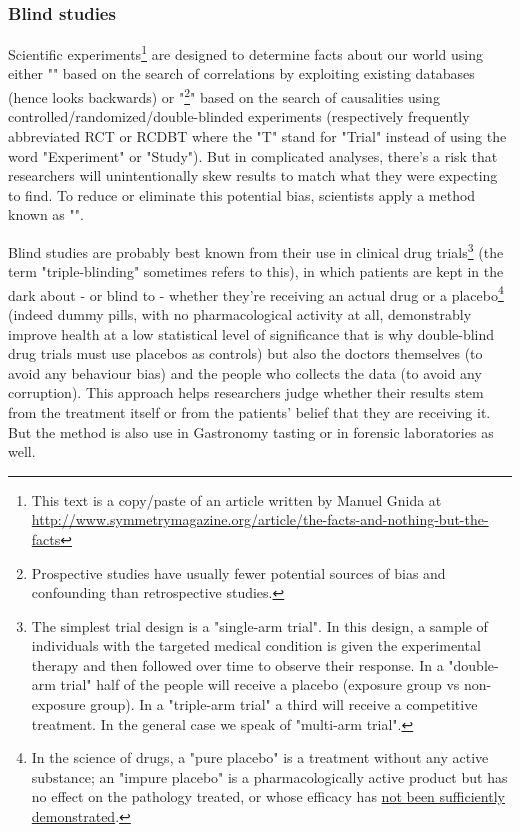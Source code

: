 	\subsubsection{Blind studies}
	Scientific experiments\footnote{This text is a copy/paste of an article written by Manuel Gnida at \url{http://www.symmetrymagazine.org/article/the-facts-and-nothing-but-the-facts}} are designed to determine facts about our world using either "" based on the search of correlations by exploiting existing databases (hence looks backwards) or "\footnote{Prospective studies have usually fewer potential sources of bias and confounding than retrospective studies.}" based on the search of causalities using controlled/randomized/double-blinded experiments (respectively frequently abbreviated RCT or RCDBT where the "T" stand for "Trial" instead of using the word "Experiment" or "Study"). But in complicated analyses, there's a risk that researchers will unintentionally skew results to match what they were expecting to find. To reduce or eliminate this potential bias, scientists apply a method known as "".
	
	Blind studies are probably best known from their use in clinical drug trials\footnote{The simplest trial design is a "single-arm trial". In this design, a sample of individuals with the targeted medical condition is given the experimental therapy and then followed over time to observe their response. In a "double-arm trial" half of the people will receive a placebo (exposure group vs non-exposure group). In a "triple-arm trial" a third will receive a competitive treatment. In the general case we speak of "multi-arm trial".} (the term "triple-blinding" sometimes refers to this), in which patients are kept in the dark about - or blind to - whether they're receiving an actual drug or a placebo\footnote{In the science of drugs, a "pure placebo" is a treatment without any active substance; an "impure placebo" is a pharmacologically active product but has no effect on the pathology treated, or whose efficacy has \underline{not been sufficiently demonstrated}.} (indeed dummy pills, with no pharmacological activity at all, demonstrably improve health at a low statistical level of significance that is why double-blind drug trials must use placebos as controls) but also the doctors themselves (to avoid any behaviour bias) and the people who collects the data (to avoid any corruption). This approach helps researchers judge whether their results stem from the treatment itself or from the patients' belief that they are receiving it. But the method is also use in Gastronomy tasting or in forensic laboratories as well.
	
